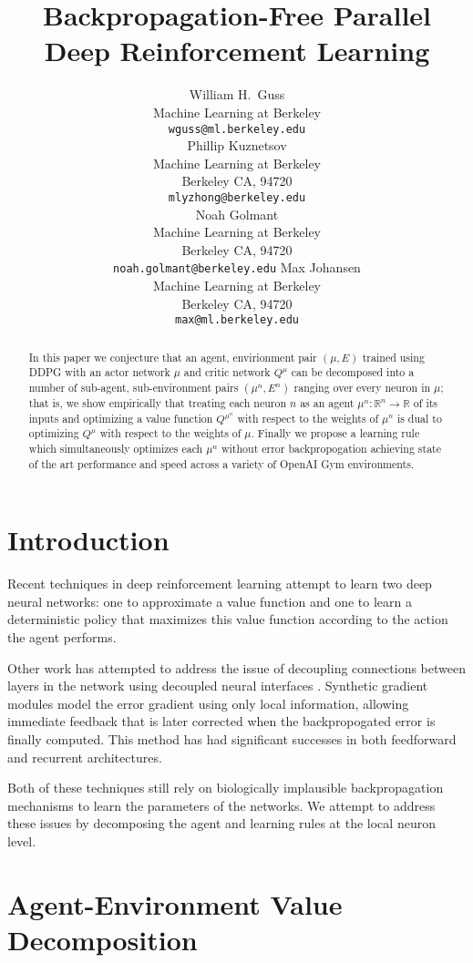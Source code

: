 \documentclass{article} %
\title{Backpropagation-Free Parallel Deep Reinforcement Learning}
\author{
William H.~Guss \\
Machine Learning at Berkeley\\
\texttt{wguss@ml.berkeley.edu} \\
\And
Phillip Kuznetsov \\
Machine Learning at Berkeley \\
Berkeley CA, 94720 \\
\texttt{mlyzhong@berkeley.edu} \\
\And
Noah Golmant\\
Machine Learning at Berkeley\\
Berkeley CA, 94720 \\
\texttt{noah.golmant@berkeley.edu}
\And
Max Johansen \\
Machine Learning at Berkeley \\
Berkeley CA, 94720 \\
\texttt{max@ml.berkeley.edu}
}
\numberwithin{equation}{subsection}
\numberwithin{theorem}{subsection}
\theoremstyle{named}
\begin{document}
\maketitle

\begin{abstract}
    In this paper we conjecture that an agent, envirionment pair $(\mu, E)$ trained using DDPG with an actor network $\mu$ and critic network $Q^{\mu}$ can be decomposed into a number of sub-agent, sub-environment pairs  $(\mu^n, E^n)$ ranging over every neuron in $\mu$; that is, we show empirically that treating each neuron $n$ as an agent $\mu^n: \mathbb{R}^n \to \mathbb{R}$ of its inputs and optimizing a value function $Q^{\mu^n}$ with respect to the weights of $\mu^n$ is dual to optimizing $Q^\mu$ with respect to the weights of $\mu$. Finally we propose a learning rule which simultaneously optimizes each $\mu^n$ without error backpropogation achieving state of the art performance and speed across a variety of OpenAI Gym environments.
\end{abstract}

\section{Introduction}
Recent techniques in deep reinforcement learning attempt to learn two deep neural networks: one to approximate a value function and one to learn a deterministic policy that maximizes this value function according to the action the agent performs.  

Other work has attempted to address the issue of decoupling connections between layers in the network using decoupled neural interfaces \cite{DBLP:journals/corr/JaderbergCOVGK16}. Synthetic gradient modules model the error gradient using only local information, allowing immediate feedback that is later corrected when the backpropogated error is finally computed. This method has had significant successes in both feedforward and recurrent architectures.

Both of these techniques still rely on biologically implausible backpropagation mechanisms to learn the parameters of the networks. We attempt to address these issues by decomposing the agent and learning rules at the local neuron level.

\section{Agent-Environment Value Decomposition}
\end{document}
